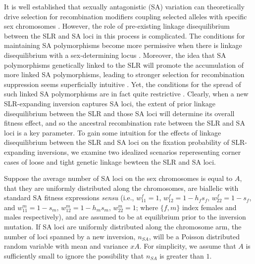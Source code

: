 \documentclass{article}[12pt]
\begin{document}
It is well established that sexually antagonistic (SA) variation can theoretically drive selection for recombination modifiers coupling selected alleles with specific sex chromosomes \cite[e.g.][]{Fisher1931,Nei1969, Charlesworth1978a, Charlesworth1980, Bull1983,Lenormand2003, Otto2019}. However, the role of pre-existing linkage disequilibrium between the SLR and SA loci in this process is complicated. The conditions for maintaining SA polymorphisms become more permissive when there is linkage disequilibrium with a sex-determining locus \citep{JordanCharlesworth2012}. Moreover, the idea that SA polymorphisms genetically linked to the SLR will promote the accumulation of more linked SA polymorphisms, leading to stronger selection for recombination suppression seems superficially intuitive \citep{Rice1984, Rice1996, Charlesworth2017, Otto2019}. Yet, the conditions for the spread of such linked SA polymorphisms are in fact quite restrictive \citep{Otto2019}. Clearly, when a new SLR-expanding inversion captures SA loci, the extent of prior linkage disequilibrium between the SLR and those SA loci will determine its overall fitness effect, and so the ancestral recombination rate between the SLR and SA loci is a key parameter. To gain some intuition for the effects of linkage disequilibrium between the SLR and SA loci on the fixation probability of SLR-expanding inversions, we examine two idealized scenarios reperesenting corner cases of loose and tight genetic linkage bewteen the SLR and SA loci.

Suppose the average number of SA loci on the sex chromosomes is equal to $A$, that they are uniformly distributed along the chromosomes, are biallelic with standard SA fitness expressions {\itshape sensu} \citet{Kidwell1977} (i.e., $w_{11}^{f} = 1$, $w_{12}^{f} = 1 - h_f s_f$, $w_{22}^{f} = 1 - s_f$, and $w_{11}^{m} = 1 - s_m$, $w_{12}^{m} = 1 - h_m s_m$, $w_{22}^{m} = 1$; where $\{f,m\}$ index females and males respectively), and are assumed to be at equilibrium prior to the inversion mutation. If SA loci are uniformly distributed along the chromosome arm, the number of loci spanned by a new inversion, $n_{SA}$, will be a Poisson distributed random variable with mean and variance $xA$. For simplicity, we assume that $A$ is sufficiently small to ignore the possibility that $n_{SA}$ is greater than $1$. 
\end{document}
